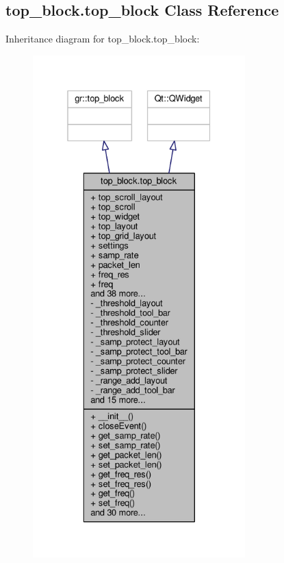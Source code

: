 \subsection{top\+\_\+block.\+top\+\_\+block Class Reference}
\label{classtop__block_1_1top__block}


Inheritance diagram for top\+\_\+block.\+top\+\_\+block\+:
\nopagebreak
\begin{figure}[H]
\begin{center}
\leavevmode
\includegraphics[height=550pt]{d3/d21/classtop__block_1_1top__block__inherit__graph}
\end{center}
\end{figure}


